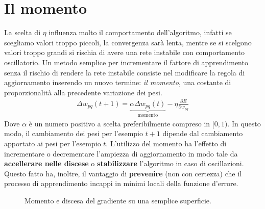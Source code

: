 	\newpage


	\section{Il momento} %
	\label{sub:il_momento}
	La scelta di $\eta$ influenza molto il comportamento dell'algoritmo, infatti se scegliamo valori troppo piccoli, la convergenza sarà lenta, mentre se si scelgono valori troppo grandi si rischia di avere una rete instabile con comportamento oscillatorio.
	Un metodo semplice per incrementare il fattore di apprendimento senza il rischio di rendere la rete instabile consiste nel modificare la regola di aggiornamento inserendo un nuovo termine: \emph{il momento}, una costante di proporzionalità alla precedente variazione dei pesi.
	\begin{align}
		\Delta w_{pq} (t + 1) = \underbrace{\alpha \Delta w_{pq} (t)}_\textrm{momento} - \eta \frac{\partial E}{\partial w_{pq}}
	\end{align}
	Dove $\alpha$ è un numero positivo a scelta preferibilmente compreso in $[0,1)$. In questo modo, il cambiamento dei pesi per l’esempio $t+1$ dipende dal cambiamento apportato ai pesi per l’esempio $t$.
	L'utilizzo del momento ha l'effetto di incrementare o decrementare l'ampiezza di aggiornamento in modo tale da \textbf{accellerare nelle discese} o \textbf{stabilizzare} l'algoritmo in caso di oscillazioni. Questo fatto ha, inoltre, il vantaggio di \textbf{prevenire} (non con certezza) che il processo di apprendimento incappi in minimi locali della funzione d'errore.

	\begin{figure}[h!]
		\centering
		\qquad
		\caption{Momento e discesa del gradiente su una semplice superficie.}
	\end{figure}

